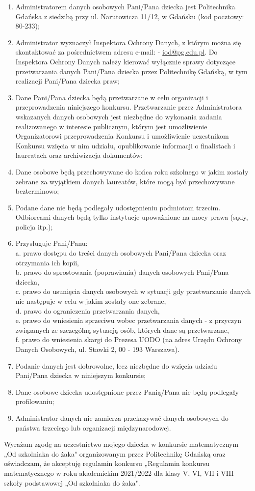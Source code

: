 \documentclass[10pt]{article}
\begin{document}
\begin{enumerate}
  \item Administratorem danych osobowych Pani/Pana dziecka jest Politechnika Gdańska z siedzibą przy ul. Narutowicza 11/12, w Gdańsku (kod pocztowy: 80-233);
  \item Administrator wyznaczył Inspektora Ochrony Danych, z którym można się skontaktować za pośrednictwem adresu e-mail: - \href{mailto:iod@pg.edu.pl}{iod@pg.edu.pl}. Do Inspektora Ochrony Danych należy kierować wyłącznie sprawy dotyczące przetwarzania danych Pani/Pana dziecka przez Politechnikę Gdańską, w tym realizacji Pani/Pana dziecka praw;
  \item Dane Pani/Pana dziecka będą przetwarzane w celu organizacji i przeprowadzenia niniejszego konkursu. Przetwarzanie przez Administratora wskazanych danych osobowych jest niezbędne do wykonania zadania realizowanego w interesie publicznym, którym jest umożliwienie Organizatorowi przeprowadzenia Konkursu i umożliwienie uczestnikom Konkursu wzięcia w nim udziału, opublikowanie informacji o finalistach i laureatach oraz archiwizacja dokumentów;
  \item Dane osobowe będą przechowywane do końca roku szkolnego w jakim zostały zebrane za wyjątkiem danych laureatów, które mogą być przechowywane bezterminowo;
  \item Podane dane nie będą podlegały udostępnieniu podmiotom trzecim. Odbiorcami danych będą tylko instytucje upoważnione na mocy prawa (sądy, policja itp.);
  \item Przysługuje Pani/Panu:\\
a. prawo dostępu do treści danych osobowych Pani/Pana dziecka oraz otrzymania ich kopii,\\
b. prawo do sprostowania (poprawiania) danych osobowych Pani/Pana dziecka,\\
c. prawo do usunięcia danych osobowych w sytuacji gdy przetwarzanie danych nie następuje w celu w jakim zostały one zebrane,\\
d. prawo do ograniczenia przetwarzania danych,\\
e. prawo do wniesienia sprzeciwu wobec przetwarzania danych - z przyczyn związanych ze szczególną sytuacją osób, których dane są przetwarzane,\\
f. prawo do wniesienia skargi do Prezesa UODO (na adres Urzędu Ochrony Danych Osobowych, ul. Stawki 2, 00 - 193 Warszawa).
  \item Podanie danych jest dobrowolne, lecz niezbędne do wzięcia udziału Pani/Pana dziecka w niniejszym konkursie;
  \item Dane osobowe dziecka udostępnione przez Panią/Pana nie będą podlegały profilowaniu;
  \item Administrator danych nie zamierza przekazywać danych osobowych do państwa trzeciego lub organizacji międzynarodowej.
\end{enumerate}

Wyrażam zgodę na uczestnictwo mojego dziecka w konkursie matematycznym „Od szkolniaka do żaka" organizowanym przez Politechnikę Gdańską oraz oświadczam, że akceptuję regulamin konkursu „Regulamin konkursu matematycznego w roku akademickim 2021/2022 dla klasy V, VI, VII i VIII szkoły podstawowej „Od szkolniaka do żaka".
\end{document}

